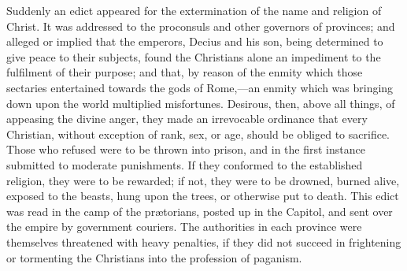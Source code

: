 Suddenly an edict appeared for the extermination of the name and
religion of Christ. It was addressed to the proconsuls and other
governors of provinces; and alleged or implied that the emperors,
Decius and his son, being determined to give peace to their subjects,
found the Christians alone an impediment to the fulfilment of their
purpose; and that, by reason of the enmity which those sectaries
entertained towards the gods of Rome,—an enmity which was bringing
down upon the world multiplied misfortunes. Desirous, then, above all
things, of appeasing the divine anger, they made an irrevocable
ordinance that every Christian, without exception of rank, sex,
or age, should be obliged to sacrifice. Those who refused were to be
thrown into prison, and in the first instance submitted to moderate
punishments. If they conformed to the established religion, they were
to be rewarded; if not, they were to be drowned, burned alive, exposed
to the beasts, hung upon the trees, or otherwise put to death. This
edict was read in the camp of the prætorians, posted up in the
Capitol, and sent over the empire by government couriers. The
authorities in each province were themselves threatened with heavy
penalties, if they did not succeed in frightening or tormenting the
Christians into the profession of paganism.


